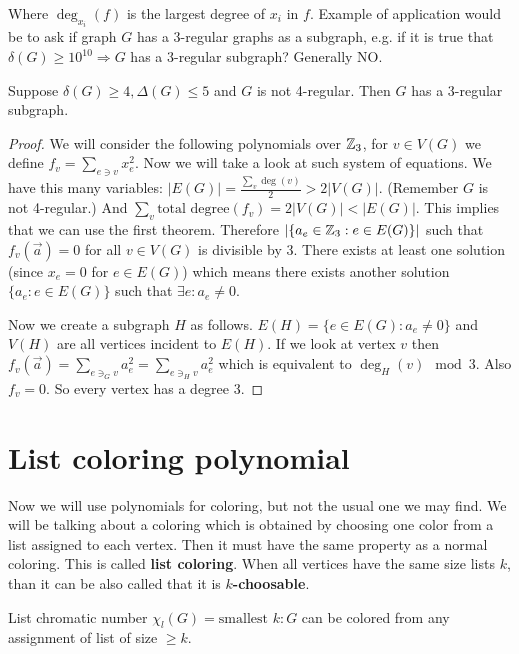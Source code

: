 Where $\deg_{x_{i}}(f)$ is the largest degree of $x_{i}$ in $f$. Example of application would be to ask if graph $G$ has a $3$-regular graphs as a subgraph, e.g. if it is true that $\delta(G) \geq 10^{10} \Rightarrow G$ has a $3$-regular subgraph? Generally NO.

\begin{thm}
	Suppose $\delta(G) \geq 4, \Delta(G) \leq 5$ and $G$ is not 4-regular. Then $G$ has a $3$-regular subgraph.
\end{thm}

\begin{proof}
	We will consider the following polynomials over $\mathbb{Z}_{3}$, for $v \in V(G)$ we define $f_{v} = \sum_{e \ni v} x_{e}^{2}$. Now we will take a look at such system of equations. We have this many variables: $|E(G)| = \frac{\sum_{v} \deg(v)}{2} > 2|V(G)|$. (Remember $G$ is not 4-regular.) And $\sum_{v} \text{total degree}(f_v) = 2|V(G)| < |E(G)|$. This implies that we can use the first theorem. Therefore $|\{a_{e} \in \mathbb{Z}_{3} : e \in E(G)\}|$ such that $f_{v}(\overrightarrow{a}) =0$ for all $v \in V(G)$ is divisible by 3. There exists at least one solution (since $x_{e} = 0$ for $e \in E(G)$) which means there exists another solution $\{a_{e} : e \in E(G)\}$ such that $\exists e : a_{e} \neq 0$.
	
	Now we create a subgraph $H$ as follows. $E(H) = \{e \in E(G) : a_{e} \neq 0\}$ and $V(H)$ are all vertices incident to $E(H)$. If we look at vertex $v$ then $f_{v}(\overrightarrow{a}) = \sum_{e \ni_{G} v} a_{e}^{2} = \sum_{e \ni_{H} v} a_{e}^{2}$ which is equivalent to $\deg_{H}(v) \mod 3$. Also $f_{v} = 0$. So every vertex has a degree 3.
\end{proof}

\section{List coloring polynomial}

Now we will use polynomials for coloring, but not the usual one we may find. We will be talking about a coloring which is obtained by choosing one color from a list assigned to each vertex. Then it must have the same property as a normal coloring. This is called \textbf{list coloring}. When all vertices have the same size lists $k$, than it can be also called that it is \textbf{$k$-choosable}.

\begin{defn}
	List chromatic number $\chi_{l}(G) = \text{smallest } k : G$ can be colored from any assignment of list of size $\geq k$.
\end{defn}

